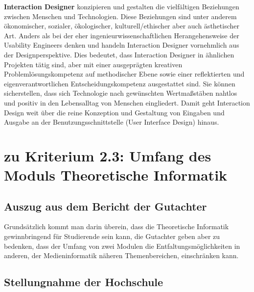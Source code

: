 \textbf{Interaction Designer} konzipieren und gestalten die vielfältigen
Beziehungen zwischen Menschen und Technologien. Diese Beziehungen sind
unter anderem ökonomischer, sozialer, ökologischer, kulturell/ethischer
aber auch ästhetischer Art. Anders als bei der eher
ingenieurwissenschaftlichen Herangehensweise der Usability Engineers
denken und handeln Interaction Designer vornehmlich aus der
Designperspektive. Dies bedeutet, dass Interaction Designer in ähnlichen
Projekten tätig sind, aber mit einer ausgeprägten kreativen
Problemlösungskompetenz auf methodischer Ebene sowie einer reflektierten
und eigenverantwortlichen Entscheidungskompetenz ausgestattet sind. Sie
können sicherstellen, dass sich Technologie nach gewünschten
Wertmaßstäben nahtlos und positiv in den Lebensalltag von Menschen
eingliedert. Damit geht Interaction Design weit über die reine
Konzeption und Gestaltung von Eingaben und Ausgabe an der
Benutzungsschnittstelle (User Interface Design) hinaus.

\section{zu Kriterium 2.3: Umfang des Moduls Theoretische
Informatik\label{/mi-2017/selbstbericht/stellungnahme/0000-stellungnahme}}\label{zu-kriterium-2.3-umfang-des-moduls-theoretische-informatikpathlabelmi-2017selbstberichtstellungnahme0000-stellungnahme}

\subsection{Auszug aus dem Bericht der
Gutachter\label{/mi-2017/selbstbericht/stellungnahme/0000-stellungnahme}}\label{auszug-aus-dem-bericht-der-gutachterpathlabelmi-2017selbstberichtstellungnahme0000-stellungnahme-1}

\begin{siderules}
Grundsätzlich kommt man darin überein, dass die Theoretische Informatik
gewinnbringend für Studierende sein kann, die Gutachter geben aber zu
bedenken, dass der Umfang von zwei Modulen die Entfaltungsmöglichkeiten
in anderen, der Medieninformatik näheren Themenbereichen, einschränken
kann.
\end{siderules}

\subsection{Stellungnahme der
Hochschule\label{/mi-2017/selbstbericht/stellungnahme/0000-stellungnahme}}\label{stellungnahme-der-hochschulepathlabelmi-2017selbstberichtstellungnahme0000-stellungnahme}

